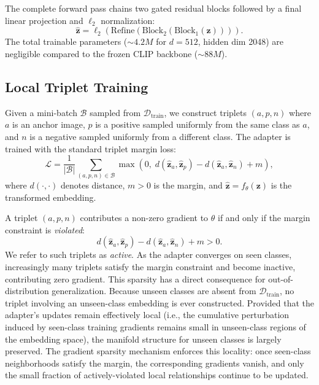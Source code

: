 \documentclass{article}
\begin{document}
The complete forward pass chains two gated residual blocks followed by a final linear projection and $\ell_2$ normalization:
\begin{equation}
    \hat{\mathbf{z}} = \ell_2\!\left(\text{Refine}\!\left(\text{Block}_2\!\left(\text{Block}_1(\mathbf{z})\right)\right)\right).
    \label{eq:forward}
\end{equation}
The total trainable parameters (${\sim}4.2M$ for $d{=}512$, hidden dim 2048) are negligible compared to the frozen CLIP backbone (${\sim}88M$).

\subsection{Local Triplet Training}
\label{sec:training}

Given a mini-batch $\mathcal{B}$ sampled from $\mathcal{D}_{\text{train}}$, we construct triplets $(a, p, n)$ where $a$ is an anchor image, $p$ is a positive sampled uniformly from the same class as $a$, and $n$ is a negative sampled uniformly from a different class.
The adapter is trained with the standard triplet margin
loss:
\begin{equation}
	\mathcal{L} = \frac{1}{|\mathcal{B}|}
	\sum_{(a,p,n) \in \mathcal{B}}
	\max\!\left(0,\;
	d\!\left(\hat{\mathbf{z}}_a, \hat{\mathbf{z}}_p\right)
	- d\!\left(\hat{\mathbf{z}}_a, \hat{\mathbf{z}}_n\right)
	+ m
	\right),
	\label{eq:triplet}
\end{equation}
where $d(\cdot,\cdot)$ denotes distance, $m > 0$ is the margin, and $\hat{\mathbf{z}} = f_\theta(\mathbf{z})$ is the
transformed embedding.

A triplet $(a, p, n)$ contributes a non-zero gradient to $\theta$ if and only
if the margin constraint is \emph{violated}:
\begin{equation}
	d\!\left(\hat{\mathbf{z}}_a, \hat{\mathbf{z}}_p\right)
	- d\!\left(\hat{\mathbf{z}}_a, \hat{\mathbf{z}}_n\right)
	+ m > 0.
	\label{eq:active}
\end{equation}
We refer to such triplets as \emph{active}.
As the adapter converges on seen classes, increasingly many triplets satisfy the margin constraint and become inactive, contributing zero gradient.
This sparsity has a direct consequence for out-of-distribution generalization.
Because unseen classes are absent from $\mathcal{D}_{\text{train}}$, no triplet involving an unseen-class embedding is ever constructed.
Provided that the adapter's updates remain effectively local (i.e., the cumulative perturbation induced by seen-class training gradients remains small in unseen-class regions of the embedding space), the manifold structure for unseen classes is largely preserved.
The gradient sparsity mechanism enforces this locality: once seen-class neighborhoods satisfy the margin, the corresponding gradients vanish, and only the small fraction of actively-violated local relationships continue to be updated.
\end{document}
